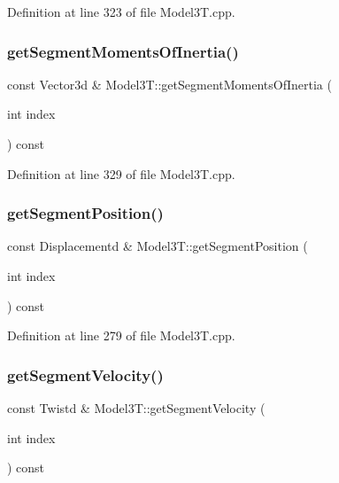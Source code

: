 Definition at line 323 of file Model3\+T.\+cpp.

\hypertarget{classModel3T_abac667ae49c8690ddf20ca1ae0154459}{}\label{classModel3T_abac667ae49c8690ddf20ca1ae0154459} 
\subsubsection{\texorpdfstring{get\+Segment\+Moments\+Of\+Inertia()}{getSegmentMomentsOfInertia()}}
{\footnotesize\ttfamily const Vector3d \& Model3\+T\+::get\+Segment\+Moments\+Of\+Inertia (\begin{DoxyParamCaption}\item[{int}]{index }\end{DoxyParamCaption}) const\hspace{0.3cm}{\ttfamily [virtual]}}



Definition at line 329 of file Model3\+T.\+cpp.

\hypertarget{classModel3T_af2408d3a32ae4762ce3c5951360f5f67}{}\label{classModel3T_af2408d3a32ae4762ce3c5951360f5f67} 
\subsubsection{\texorpdfstring{get\+Segment\+Position()}{getSegmentPosition()}}
{\footnotesize\ttfamily const Displacementd \& Model3\+T\+::get\+Segment\+Position (\begin{DoxyParamCaption}\item[{int}]{index }\end{DoxyParamCaption}) const\hspace{0.3cm}{\ttfamily [virtual]}}



Definition at line 279 of file Model3\+T.\+cpp.

\hypertarget{classModel3T_ac94524afc47ca5c16045b53d6c5b6118}{}\label{classModel3T_ac94524afc47ca5c16045b53d6c5b6118} 
\subsubsection{\texorpdfstring{get\+Segment\+Velocity()}{getSegmentVelocity()}}
{\footnotesize\ttfamily const Twistd \& Model3\+T\+::get\+Segment\+Velocity (\begin{DoxyParamCaption}\item[{int}]{index }\end{DoxyParamCaption}) const\hspace{0.3cm}{\ttfamily [virtual]}}



